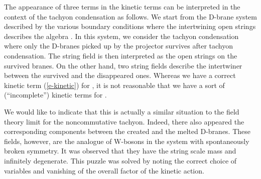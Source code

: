 \documentclass[a4paper,12pt]{article}
\begin{document}
The appearance of three terms in the kinetic terms can be
interpreted in the context of the tachyon condensation
\cite{r-Sen, r-HKLM, r-Witten2}  as follows.
We start from the D-brane system described by the
various boundary conditions where the intertwining open strings
describes the algebra \myHighlight{$\cC$}\coordHE{}.  In this system, we consider the tachyon
condensation where only 
the D-branes picked up by the projector \coordHE{} survives
after tachyon condensation.
The string field \coordHE{} is then interpreted as the open strings
on the survived branes.  On the other hand,
two string fields \coordHE{} describe the intertwiner
between the survived and the disappeared ones.
Whereas we have a correct kinetic term  (\ref{e-kinetic})
for \coordHE{}, it is not reasonable that we have
a sort of (``incomplete'') kinetic terms for \coordHE{}.

We would like to indicate that
this is actually a similar situation to
the field theory limit \cite{r-HKLM} for the noncommutative
tachyon.  Indeed, there also appeared the corresponding
components between the created and the melted D-branes.
These fields, however, are the analogue of W-bosons in the
system with spontaneously broken symmetry.
It was observed that they have the string scale
mass and infinitely degenerate. This puzzle was solved
\cite{r-GMS2,r-Seiberg, r-Sen2} by noting the correct choice
of variables and  vanishing of the overall factor of
the kinetic action.
\end{document}
